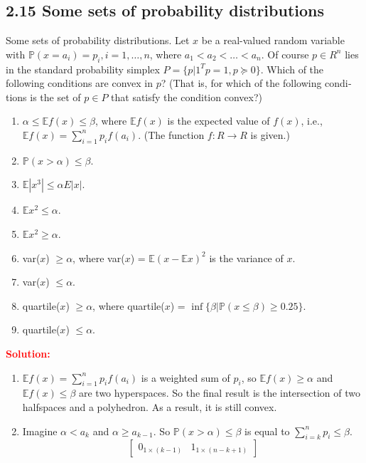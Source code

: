 \documentclass[a4paper]{article}
\begin{document}
\begin{latin}
\section{2.15 Some sets of probability distributions}
Some sets of probability distributions. Let $ x $ be a real-valued random variable with $ \mathbb{P}(x = a_{i}) = p_{i}, i = 1, \dots , n $, where $ a_{1} < a_{2} < \dots < a_{n} $. Of course $ p \in R^{n} $ lies in the standard probability simplex $ P = \{p | 1^{T} p = 1, p \succeq 0\} $. Which of the following conditions are convex in $ p $? (That is, for which of the following conditions is the set of $ p \in P $ that satisfy the condition convex?)
\begin{enumerate}
	\item $ \alpha \leq \mathbb{E}f(x) \leq \beta $, where $ \mathbb{E}f(x) $ is the expected value of $ f(x) $, i.e., $ \mathbb{E}f(x) = \sum_{i=1}^{n}  p_{i}f(a_{i}) $. (The  function $ f : R \rightarrow R $ is given.)
	\item $ \mathbb{P}(x > \alpha) \leq \beta $.
	\item $ \mathbb{E} |x^{3}| \leq \alpha E |x| $.
	\item  $ \mathbb{E} x^{2} \leq \alpha $.
	\item  $ \mathbb{E} x^{2} \geq \alpha $.
	\item  var($ x $) $ \geq \alpha $, where var($ x $) = $\mathbb{E}( x - \mathbb{E}x )^{2}$ is the variance of $ x $.
	\item  var($ x $) $ \leq \alpha $.
	\item  quartile($ x $) $ \geq \alpha $, where quartile($ x $) = $ \inf\{\beta | \mathbb{P}(x \leq \beta) \geq 0.25\} $.
	\item  quartile($ x $) $ \leq \alpha $.
\end{enumerate}
\textcolor{red}{\textbf{Solution:}}
\begin{enumerate}
	\item $ \mathbb{E}f(x) = \sum_{i=1}^{n}  p_{i}f(a_{i}) $ is a weighted sum of $  p_{i} $, so $ \mathbb{E}f(x) \geq \alpha $ and $ \mathbb{E}f(x) \leq \beta $ are two hyperspaces. So the final result is the intersection of two halfspaces and a polyhedron. As a result, it is still convex. 
	\item Imagine $ \alpha < a_{k} $ and  $ \alpha \geq a_{k-1} $. So $ \mathbb{P}(x > \alpha) \leq \beta $ is equal to $ \sum_{i=k}^{n} p_{i} \leq \beta $. 
	\begin{equation*}
		\begin{bmatrix}
			0_{1 \times (k-1)} & 1_{1 \times (n-k+1)}

\end{bmatrix}
\end{equation*}
\end{enumerate}
\end{latin}
\end{document}
